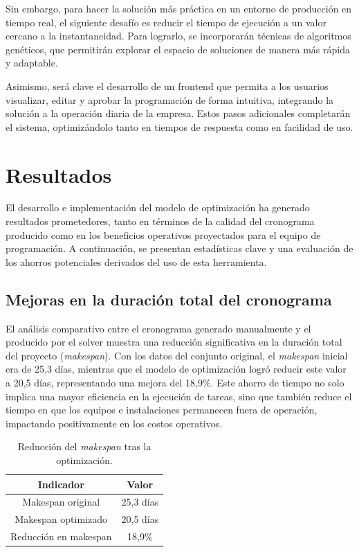 \documentclass{article}
\begin{document}
Sin embargo, para hacer la solución más práctica en un entorno de producción en tiempo real, el siguiente desafío es reducir el tiempo de ejecución a un valor cercano a la instantaneidad. Para lograrlo, se incorporarán técnicas de algoritmos genéticos, que permitirán explorar el espacio de soluciones de manera más rápida y adaptable.

Asimismo, será clave el desarrollo de un frontend que permita a los usuarios visualizar, editar y aprobar la programación de forma intuitiva, integrando la solución a la operación diaria de la empresa. Estos pasos adicionales completarán el sistema, optimizándolo tanto en tiempos de respuesta como en facilidad de uso.




\section{Resultados}

El desarrollo e implementación del modelo de optimización ha generado resultados prometedores, tanto en términos de la calidad del cronograma producido como en los beneficios operativos proyectados para el equipo de programación. A continuación, se presentan estadísticas clave y una evaluación de los ahorros potenciales derivados del uso de esta herramienta.

\subsection{Mejoras en la duración total del cronograma}

El análisis comparativo entre el cronograma generado manualmente y el producido por el solver muestra una reducción significativa en la duración total del proyecto (\textit{makespan}). Con los datos del conjunto original, el \textit{makespan} inicial era de 25,3 días, mientras que el modelo de optimización logró reducir este valor a 20,5 días, representando una mejora del 18,9\%. Este ahorro de tiempo no solo implica una mayor eficiencia en la ejecución de tareas, sino que también reduce el tiempo en que los equipos e instalaciones permanecen fuera de operación, impactando positivamente en los costos operativos.

\begin{table}[H]
\centering
\begin{tabular}{|c|c|}
\hline
\textbf{Indicador}            & \textbf{Valor}       \\ \hline
Makespan original             & 25,3 días           \\ \hline
Makespan optimizado           & 20,5 días           \\ \hline
Reducción en makespan         & 18,9\%              \\ \hline
\end{tabular}
\caption{Reducción del \textit{makespan} tras la optimización.}
\label{tab:makespan}
\end{table}
\end{document}
